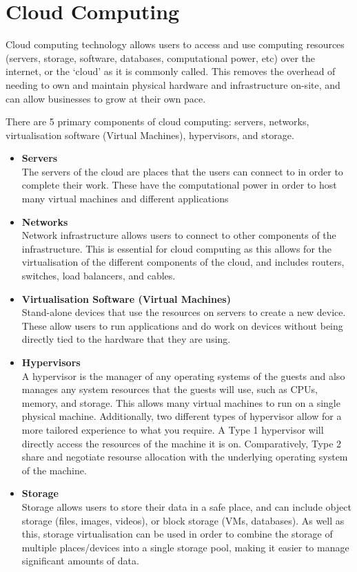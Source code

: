 
\section{Cloud Computing}

Cloud computing technology allows users to access and use computing resources (servers, storage, software, databases, computational power, etc) over the internet, or the ‘cloud’ as it is commonly called. This removes the overhead of needing to own and maintain physical hardware and infrastructure on-site, and can allow businesses to grow at their own pace.

There are 5 primary components of cloud computing: servers, networks, virtualisation software (Virtual Machines), hypervisors, and storage.

\begin{itemize}
    \item \textbf{Servers} \\ The servers of the cloud are places that the users can connect to in order to complete their work. These have the computational power in order to host many virtual machines and different applications

    \item \textbf{Networks} \\ Network infrastructure allows users to connect to other components of the infrastructure. This is essential for cloud computing as this allows for the virtualisation of the different components of the cloud, and includes routers, switches, load balancers, and cables.

    \item \textbf{Virtualisation Software (Virtual Machines)} \\ Stand-alone devices that use the resources on servers to create a new device. These allow users to run applications and do work on devices without being directly tied to the hardware that they are using.

    \item \textbf{Hypervisors} \\ A hypervisor is the manager of any operating systems of the guests and also manages any system resources that the guests will use, such as CPUs, memory, and storage. This allows many virtual machines to run on a single physical machine. Additionally, two different types of hypervisor allow for a more tailored experience to what you require. A Type 1 hypervisor will directly access the resources of the machine it is on. Comparatively, Type 2 share and negotiate resourse allocation with the underlying operating system of the machine.

    \item \textbf{Storage} \\ Storage allows users to store their data in a safe place, and can include object storage (files, images, videos), or block storage (VMs, databases). As well as this, storage virtualisation can be used in order to combine the storage of multiple places/devices into a single storage pool, making it easier to manage significant amounts of data.

\end{itemize}

